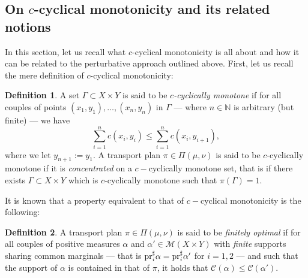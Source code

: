 \documentclass[leqno, 11pt, a4paper]{amsart}
\theoremstyle{definition}
\newtheorem{defi}{Definition}
\newcommand{\C}{\mathscr{C}}
\newcommand{\N}{\mathbb{N}}
\newcommand{\cM}{\mathcal{M}}
\newcommand{\pr}{{\rm pr}}
\begin{document}
\subsection{On $c$-cyclical monotonicity and its related notions}
In this section, let us recall what $c$-cyclical monotonicity is all about and how it can be related to the perturbative approach outlined above. First, let us recall the mere definition of $c$-cyclical monotonicity:
\begin{defi}\label{def:c-cM}
	A set $\Gamma \subset X \times Y$ is said to be \textit{$c$-cyclically monotone} if for all couples of points $(x_1, y_1), \dots, (x_n, y_n)$ in $\Gamma$ — where $n \in \N$ is arbitrary (but finite) — we have
	\begin{equation}\label{eq:c-cM}
		\sum_{i = 1}^n c(x_i, y_i) \leq \sum_{i = 1}^n c(x_i, y_{i+1}),
	\end{equation}
	where we let $y_{n+1} := y_1$. A transport plan $\pi \in \Pi(\mu, \nu)$ is said to be $c$-cyclically monotone if it is \textit{concentrated }on a $c-$cyclically monotone set, that is if there exists $\Gamma \subset X \times Y$ which is $c$-cyclically monotone such that $\pi(\Gamma) = 1$.
\end{defi}
It is known that a property equivalent to that of $c-$cyclical monotonicity is the following:
\begin{defi}\label{def:fin-opt}
	A transport plan $\pi \in \Pi(\mu, \nu)$ is said to be \textit{finitely optimal} if for all couples of positive measures $\alpha$ and $ \alpha' \in \cM(X \times Y)$ with \textit{finite} supports sharing common marginals — that is $\pr_i^\sharp \alpha = \pr_i^\sharp \alpha'$ for $i = 1, 2$ — and such that the support of $\alpha$ is contained in that of $\pi$, it holds that $\C(\alpha) \leq \C(\alpha')$.
\end{defi} 
\end{document}

